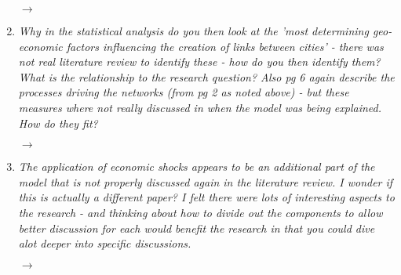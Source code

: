 \documentclass[10pt,a4paper,sans]{moderncv}        %
\begin{document}
\begin{enumerate}
	$\rightarrow$ 
	
	\medskip

	\item \textit{Why in the statistical analysis do you then look at the 'most determining geo-economic factors influencing the creation of links between cities' - there was not real literature review to identify these - how do you then identify them? What is the relationship to the research question? Also pg 6 again describe the processes driving the networks (from pg 2 as noted above) - but these measures where not really discussed in when the model was being explained. How do they fit?}
	 
	$\rightarrow$ 
	
	\medskip

	\item \textit{The application of economic shocks appears to be an additional part of the model that is not properly discussed again in the literature review. I wonder if this is actually a different paper? I felt there were lots of interesting aspects to the research - and thinking about how to divide out the components to allow better discussion for each would benefit the research in that you could dive alot deeper into specific discussions.}
	
	$\rightarrow$ 
	
	\medskip


\end{enumerate}
\end{document}
